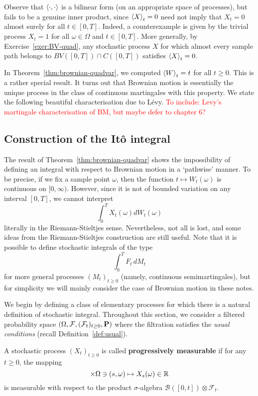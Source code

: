 Observe that $\braket{\cdot,\cdot}$ is a bilinear form (on an appropriate space of processes), but fails to be a genuine inner product, since $\braket{X}_t=0$ need not imply that $X_t=0$ almost surely for all $t\in [0,T]$. Indeed, a counterexample is given by the trivial process $X_t=1$ for all $\omega\in\Omega$ and $t\in [0,T]$. More generally, by Exercise~\ref{exer:BV-quad}, any stochastic process $X$ for which almost every sample path belongs to $BV([0,T])\cap C([0,T])$ satisfies $\braket{X}_t=0$.

In Theorem~\ref{thm:brownian-quadvar}, we computed $\braket{W}_t=t$ for all $t\ge 0$. This is a rather special result. It turns out that Brownian motion is essentially the unique process in the class of continuous martingales with this property. We state the following beautiful characterisation due to L\'{e}vy.
\textcolor{red}{To include: Levy's martingale characterisation of BM, but maybe defer to chapter 6?}

\subsection{Construction of the It\^{o} integral}
The result of Theorem~\ref{thm:brownian-quadvar} shows the impossibility of defining an integral with respect to Brownian motion in a `pathwise' manner. To be precise, if we fix a sample point $\omega$, then the function $t\mapsto W_t(\omega)$ is continuous on $[0,\infty)$. However, since it is not of bounded variation on any interval $[0,T]$, we cannot interpret
\begin{equation*}
    \int_0^T X_t(\omega) dW_t(\omega)
\end{equation*}
literally in the Riemann-Stieltjes sense. Nevertheless, not all is lost, and some ideas from the Riemann-Stieltjes construction are still useful. Note that it is possible to define stochastic integrals of the type
\begin{equation*}
    \int_0^T F_t\,dM_t
\end{equation*}
for more general processes $(M_t)_{t\ge 0}$ (namely, continuous semimartingales), but for simplicity we will mainly consider the case of Brownian motion in these notes.

We begin by defining a class of elementary processes for which there is a natural definition of stochastic integral. Throughout this section, we consider a filtered probability space $(\Omega,\mathcal{F},(\mathcal{F}_t)_{t\ge 0},\mathbf{P})$ where the filtration satisfies the \emph{usual conditions} (recall Definition~\ref{def:usual}).
\begin{definition}
\label{def:prog-meas}
    A stochastic process $(X_t)_{t\ge 0}$ is called \textbf{progressively measurable} if for any $t\ge 0$, the mapping
    \begin{equation*}
        [0,t]\times\Omega\ni (s,\omega) \mapsto X_s(\omega)\in\RR
    \end{equation*}
    is measurable with respect to the product $\sigma$-algebra $\mathscr{B}([0,t])\otimes\mathcal{F}_t$.
\end{definition}

